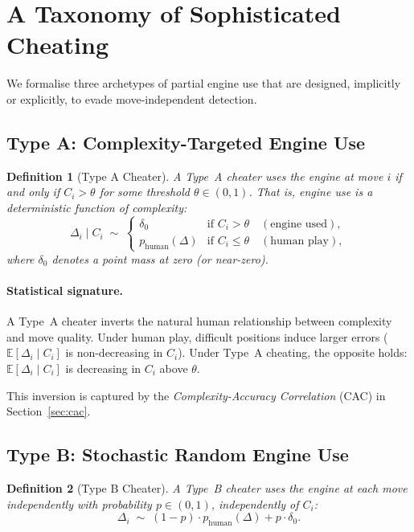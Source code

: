 \documentclass[11pt,a4paper]{article}
\newtheorem{definition}{Definition}
\begin{document}
\section{A Taxonomy of Sophisticated Cheating}
\label{sec:archetypes}

We formalise three archetypes of partial engine use that are designed,
implicitly or explicitly, to evade move-independent detection.

\subsection{Type A: Complexity-Targeted Engine Use}

\begin{definition}[Type A Cheater]
A Type~A cheater uses the engine at move $i$ if and only if $C_i > \theta$
for some threshold $\theta \in (0,1)$. That is, engine use is a deterministic
function of complexity:
\begin{equation}
  \Delta_i \mid C_i \;\sim\;
  \begin{cases}
    \delta_0 & \text{if } C_i > \theta \quad (\text{engine used}), \\
    p_{\mathrm{human}}(\Delta) & \text{if } C_i \leq \theta \quad (\text{human play}),
  \end{cases}
\end{equation}
where $\delta_0$ denotes a point mass at zero (or near-zero).
\end{definition}

\paragraph{Statistical signature.}
A Type~A cheater inverts the natural human relationship between complexity
and move quality. Under human play, difficult positions induce larger errors
($\mathbb{E}[\Delta_i \mid C_i]$ is non-decreasing in $C_i$). Under Type~A
cheating, the opposite holds: $\mathbb{E}[\Delta_i \mid C_i]$ is decreasing
in $C_i$ above $\theta$.

This inversion is captured by the \emph{Complexity-Accuracy Correlation}
(CAC) in Section~\ref{sec:cac}.

\subsection{Type B: Stochastic Random Engine Use}

\begin{definition}[Type B Cheater]
A Type~B cheater uses the engine at each move independently with probability
$p \in (0,1)$, independently of $C_i$:
\begin{equation}
  \Delta_i \;\sim\; (1-p)\cdot p_{\mathrm{human}}(\Delta) + p \cdot \delta_0.
  \label{eq:typeB_mixture}
\end{equation}
\end{definition}
\end{document}
